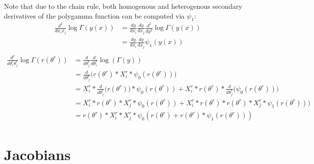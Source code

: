 \documentclass[bibliography=totoc,10pt]{scrartcl}
\begin{document}
Note that due to the chain rule, both homogenous and heterogenous secondary derivatives of the polygamma function can be computed via $\psi_1$:
\begin{equation}
\begin{split}
\frac{d^2}{d x_i x_j} \log \Gamma(y(x)) &= \frac{d y}{d x_i} \frac{d y}{d x_j} \frac{d^2 }{d y^2}  \log \Gamma(y(x)) \\
&= \frac{d y}{d x_i} \frac{d y}{d x_j} \psi_1(y(x)) \\
\end{split}
\end{equation}
\begin{equation}
\begin{split}
\frac{d^2}{d \theta^r_i \theta^r_j} \log \Gamma(r(\theta^r)) &= \frac{d}{d \theta^r_j} \frac{d}{d \theta^r_i} \log(\Gamma(y)) \\
&= \frac{d}{d \theta^r_j} \bigg( r(\theta^r) * X^r_{i} * \psi_0(r(\theta^r)) \bigg) \\
&= X^r_{i} * \frac{d}{d \theta^r_j} \bigg( r(\theta^r)  \bigg)* \psi_0(r(\theta^r)) + X^r_{i} * r(\theta^r)  *  \frac{d}{d \theta^r_j} \bigg(  \psi_0(r(\theta^r)) \bigg)   \\
&= X^r_{i} * r(\theta^r) * X^r_{j} * \psi_0(r(\theta^r)) + X^r_{i} * r(\theta^r)  * r(\theta^r) * X^r_{j} *  \psi_1(r(\theta^r)) \bigg)   \\
&= r(\theta^r) * X^r_{i} * X^r_{j} * \psi_0(r(\theta^r) +  r(\theta^r) *  \psi_1(r(\theta^r)) )   \\
\end{split}
\end{equation}

\section{Jacobians}
\end{document}
